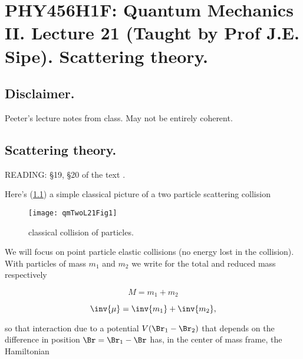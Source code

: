 
%

\chapter{PHY456H1F: Quantum Mechanics II.  Lecture 21 (Taught by Prof J.E. Sipe).  Scattering theory.}
\label{chap:qmTwoL21}
{}
\date{Nov 23, 2011}

\beginArtWithToc

\section{Disclaimer.}

Peeter's lecture notes from class.  May not be entirely coherent.

\section{Scattering theory.}

READING: \S 19, \S 20 of the text \cite{desai2009quantum}.

Here's (\ref{fig:qmTwoL21:qmTwoL21Fig1}) a simple classical picture of a two particle scattering collision

\begin{figure}[htp]
   \centering
   \texttt{[image: qmTwoL21Fig1]}
   \caption{classical collision of particles.}\label{fig:qmTwoL21:qmTwoL21Fig1}
\end{figure}

We will focus on point particle elastic collisions (no energy lost in the collision).  With particles of mass $m_1$ and $m_2$ we write for the total and reduced mass respectively

\begin{equation}\label{eqn:qmTwoL21:10}
M = m_1 + m_2
\end{equation}

\begin{equation}\label{eqn:qmTwoL21:30}
\inv{\mu} = \inv{m_1} + \inv{m_2},
\end{equation}

so that interaction due to a potential $V(\Br_1 - \Br_2)$ that depends on the difference in position $\Br = \Br_1 - \Br$ has, in the center of mass frame, the Hamiltonian

